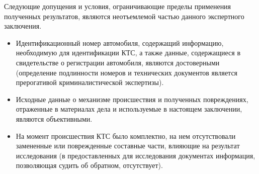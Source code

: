 Следующие допущения и условия, ограничивающие пределы применения полученных результатов, являются неотъемлемой частью данного экспертного заключения.
\begin{itemize}
	
	
	\item 
{	Идентификационный номер автомобиля, содержащий информацию, необходимую для идентификации КТС, а также данные, содержащиеся в свидетельстве о регистрации автомобиля, являются достоверными (определение подлинности номеров и технических документов является прерогативой криминалистической экспертизы).}
	
	\item 
{	Исходные данные о механизме происшествия и полученных повреждениях, отраженные в материалах дела и используемые в настоящем заключении, являются объективными.}
	
	
	\item 
{	На момент происшествия КТС было комплектно, на нем отсутствовали замененные или поврежденные составные части, влияющие на результат исследования (в предоставленных для исследования документах информация, позволяющая судить об обратном, отсутствует).
	}


\end{itemize}
